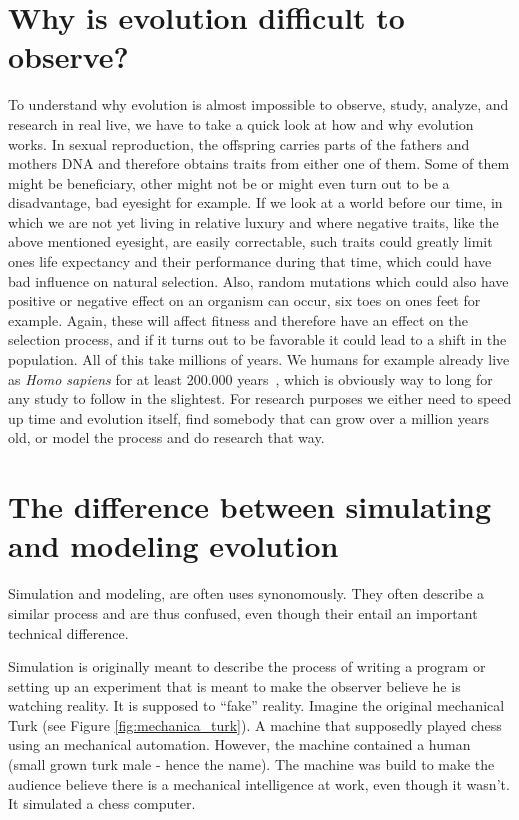 \documentclass[12pt,oneside,listof=totoc,paper=a4,headings=small]{scrbook}
\begin{document}
\section{Why is evolution difficult to observe?}
To understand why evolution is almost impossible to observe, study, analyze, and research in real live, we have to take a quick look at how and why evolution works.
In sexual reproduction, the offspring carries parts of the fathers and mothers DNA and therefore obtains traits from either one of them. Some of them might be beneficiary, other might not be or might even turn out to be a disadvantage, bad eyesight for example. If we look at a world before our time, in which we are not yet living in relative luxury and where negative traits, like the above mentioned eyesight, are easily correctable, such traits could greatly limit ones life expectancy and their performance during that time, which could have bad influence on natural selection.
Also, random mutations which could also have positive or negative effect on an organism can occur, six toes on ones feet for example. Again, these will affect fitness and therefore have an effect on the selection process, and if it turns out to be favorable it could lead to a shift in the population.
All of this take millions of years. We humans for example already live as \textit{Homo sapiens} for at least 200.000 years~\cite{mcdougall2005stratigraphic}, which is obviously way to long for any study to follow in the slightest. For research purposes we either need to speed up time and evolution itself, find somebody that can grow over a million years old, or model the process and do research that way.

\newpage
\section{The difference between simulating and modeling evolution}

Simulation and modeling, are often uses synonomously. They often describe a similar process and are thus confused, even though their entail an important technical difference.

Simulation is originally meant to describe the process of writing a program or setting up an experiment that is meant to make the observer believe he is watching reality. It is supposed to ``fake'' reality. Imagine the original mechanical Turk (see Figure \ref{fig:mechanica_turk}). A machine that supposedly played chess using an mechanical automation. However, the machine contained a human (small grown turk male - hence the name). The machine was build to make the audience believe there is a mechanical intelligence at work, even though it wasn't. It simulated a chess computer. 
\end{document}
